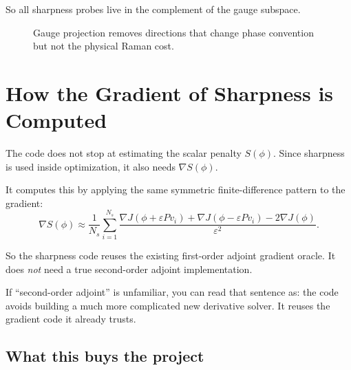 \documentclass[11pt,letterpaper]{article}
\begin{document}
So all sharpness probes live in the complement of the gauge subspace.

\begin{figure}[htbp]
\centering
{}
\caption{Gauge projection removes directions that change phase convention but not the physical Raman cost.}
\end{figure}

\section{How the Gradient of Sharpness is Computed}

The code does not stop at estimating the scalar penalty $S(\phi)$. Since
sharpness is used inside optimization, it also needs $\nabla S(\phi)$.

It computes this by applying the same symmetric finite-difference pattern to
the gradient:
\[
\nabla S(\phi)
\approx
\frac{1}{N_s}
\sum_{i=1}^{N_s}
\frac{
\nabla J(\phi+\varepsilon Pv_i)
+
\nabla J(\phi-\varepsilon Pv_i)
-
2\nabla J(\phi)
}{\varepsilon^2}.
\]

So the sharpness code reuses the existing first-order adjoint gradient oracle.
It does \emph{not} need a true second-order adjoint implementation.

If ``second-order adjoint'' is unfamiliar, you can read that sentence as:
the code avoids building a much more complicated new derivative solver. It
reuses the gradient code it already trusts.

\subsection{What this buys the project}
\end{document}
